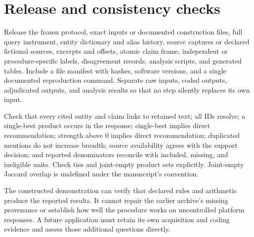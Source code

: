 \documentclass[10pt,a4paper]{article}
\begin{document}
\section{Release and consistency checks}
Release the frozen protocol, exact inputs or documented construction files, full query instrument, entity dictionary and alias history, source captures or declared fictional sources, excerpts and offsets, atomic claim frame, independent or procedure-specific labels, disagreement records, analysis scripts, and generated tables. Include a file manifest with hashes, software versions, and a single documented reproduction command. Separate raw inputs, coded outputs, adjudicated outputs, and analysis results so that no step silently replaces its own input.

Check that every cited entity and claim links to retained text; all IDs resolve; a single-best product occurs in the response; single-best implies direct recommendation; strength above 0 implies direct recommendation; duplicated mentions do not increase breadth; source availability agrees with the support decision; and reported denominators reconcile with included, missing, and ineligible units. Check ties and joint-empty product sets explicitly. Joint-empty Jaccard overlap is undefined under the manuscript's convention.

The constructed demonstration can verify that declared rules and arithmetic produce the reported results. It cannot repair the earlier archive's missing provenance or establish how well the procedure works on uncontrolled platform responses. A future application must retain its own acquisition and coding evidence and assess those additional questions directly.
\end{document}
